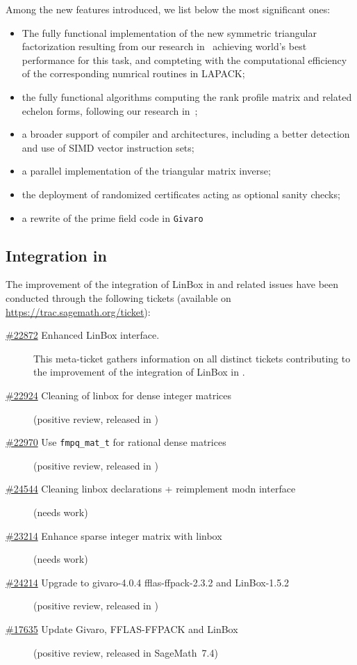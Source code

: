 \documentclass{deliverablereport}
\begin{document}
Among the new features introduced, we list below the most significant ones:
\begin{itemize}
\item The fully functional implementation of the new symmetric triangular
  factorization resulting from our research in~\cite{DuPe18} achieving world's
  best performance for this task, and compteting with the computational
  efficiency of the corresponding numrical routines in LAPACK;
\item the fully functional algorithms computing the rank profile matrix and
  related echelon forms, following our research in~\cite{DPS17};
\item a broader support of compiler and architectures, including a better
  detection and use of SIMD vector instruction sets;
\item a parallel implementation of the triangular matrix inverse;
\item the deployment of randomized certificates acting as optional sanity checks;
\item a rewrite of the prime field code in \texttt{Givaro}
\end{itemize}
\subsection{Integration in \Sage}


The improvement of the integration of LinBox in \Sage and related issues have
been conducted through the following tickets (available on \url{https://trac.sagemath.org/ticket}):
{\small
  \begin{description}
\item[\href{https://trac.sagemath.org/ticket/22872}{\#22872}
  Enhanced LinBox interface.]
  This meta-ticket gathers information on all distinct tickets contributing to
  the improvement of the integration of LinBox in \Sage. 
\item[\href{https://trac.sagemath.org/ticket/22924}{\#22924}
  Cleaning of linbox for dense integer matrices] (positive review, released in )
\item[\href{https://trac.sagemath.org/ticket/22970}{\#22970}
  Use \texttt{fmpq\_mat\_t} for rational dense matrices]
  (positive review, released in )
\item[\href{https://trac.sagemath.org/ticket/24544}{\#24544}
  Cleaning linbox declarations + reimplement modn interface]
  (needs work)
\item[\href{https://trac.sagemath.org/ticket/23214}{\#23214}
  Enhance sparse integer matrix with linbox]
  (needs work)
\item[\href{https://trac.sagemath.org/ticket/24214}{\#24214}
  Upgrade to givaro-4.0.4 fflas-ffpack-2.3.2 and LinBox-1.5.2]
  (positive review, released in )
\item[\href{https://trac.sagemath.org/ticket/17635}{\#17635}
  	Update Givaro, FFLAS-FFPACK and LinBox]
  (positive review, released in Sage\-Math~7.4)
\end{description}
}
\end{document}
